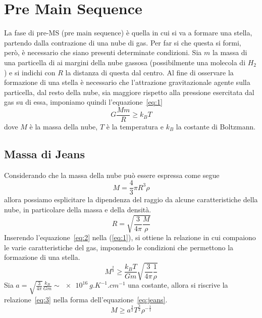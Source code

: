 \section{Pre Main Sequence}\label{sec:pre-main-sequence}

La fase di pre-MS (pre main sequence) è quella in cui si va a formare una stella, partendo dalla contrazione di una nube di gas. Per far si che questa si formi, però, è necessario che siano presenti determinate condizioni. Sia $m$ la massa di una particella di ai margini della nube gassosa (possibilmente una molecola di $H_2$) e si indichi con $R$ la distanza di questa dal centro. Al fine di osservare la formazione di una stella è necessario che l'attrazione gravitazionale agente sulla particella, dal resto della nube, sia maggiore rispetto alla pressione esercitata dal gas su di essa, imponiamo quindi l'equazione~\ref{eq:1}
\begin{equation}
    G \frac{M m}{R} \geq k_B T
    \label{eq:1}
\end{equation}
dove $M$ è la massa della nube, $T$ è la temperatura e $k_B$ la costante di Boltzmann.
\subsection{Massa di Jeans}\label{sec:massa-jeans}

Considerando che la massa della nube può essere espressa come segue
\[
    M = \frac{4}{3} \pi R^3 \rho
\]
allora possiamo esplicitare la dipendenza del raggio da alcune caratteristiche della nube, in particolare della massa e della densità.
\begin{equation}
    R = \sqrt{\frac{3}{4\pi} \frac{M}{\rho}}
    \label{eq:2}
\end{equation}
Inserendo l'equazione~\ref{eq:2} nella (\ref{eq:1}), si ottiene la relazione in cui compaiono le varie caratteristiche del gas, imponendo le condizioni che permettono la formazione di una stella.
\begin{equation}
    M^{\frac{2}{3}} \geq \frac{k_B T}{G m} \sqrt{\frac{3}{4\pi} \frac{1}{\rho}}
    \label{eq:3}
\end{equation}
Sia $a = \sqrt{\frac{3}{4\pi}}\frac{k_B}{G m} \sim \SI{e16}{g.K^{-1}.cm^{-1}}$ una costante, allora si riscrive la relazione~\ref{eq:3} nella forma dell'equazione~\ref{eq:jeans}.
\begin{equation}
    M \geq a^{\frac{3}{2}} T^{\frac{3}{2}} \rho^{-\frac{1}{1}}
\label{eq:jeans}
\end{equation}

